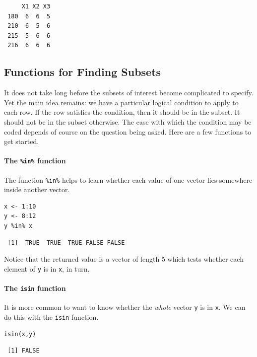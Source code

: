 \documentclass[captions=tableheading]{scrbook}
\begin{document}
\begin{verbatim}
     X1 X2 X3
 180  6  6  5
 210  6  5  6
 215  5  6  6
 216  6  6  6
\end{verbatim}
\subsection{Functions for Finding Subsets}
\label{sec-4-2-1}


It does not take long before the subsets of interest become complicated to specify. Yet the main idea remains: we have a particular logical condition to apply to each row. If the row satisfies the condition, then it should be in the subset. It should not be in the subset otherwise. The ease with which the condition may be coded depends of course on the question being asked. Here are a few functions to get started.

\paragraph*{The \texttt{\%in\%} function}

The function \texttt{\%in\%} helps to learn whether each value of one vector lies somewhere inside another vector. 


\begin{verbatim}
x <- 1:10 
y <- 8:12 
y %in% x
\end{verbatim}

\begin{verbatim}
 [1]  TRUE  TRUE  TRUE FALSE FALSE
\end{verbatim}

Notice that the returned value is a vector of length 5 which tests whether each element of \texttt{y} is in \texttt{x}, in turn.

\paragraph*{The \texttt{isin} function}

It is more common to want to know whether the \emph{whole} vector \texttt{y} is in \texttt{x}. We can do this with the \texttt{isin} function. 


\begin{verbatim}
isin(x,y)
\end{verbatim}

\begin{verbatim}
 [1] FALSE
\end{verbatim}
\end{document}
